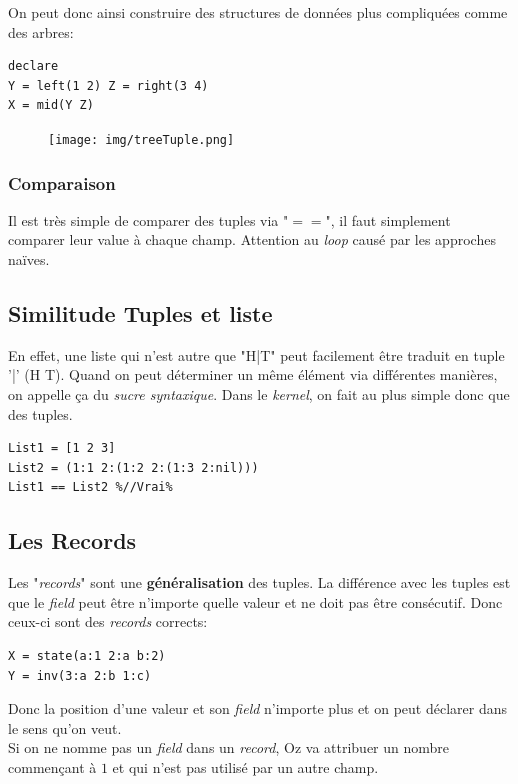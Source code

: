 \documentclass{report}
\begin{document}
On peut donc ainsi construire des structures de données plus compliquées comme des arbres:
\begin{lstlisting}
declare
Y = left(1 2) Z = right(3 4)
X = mid(Y Z)
\end{lstlisting}

\begin{figure}[H]
\centering
\texttt{[image: img/treeTuple.png]}
\end{figure}
\subsubsection{Comparaison}
Il est très simple de comparer des tuples via "$==$", il faut simplement comparer leur value à chaque champ. Attention au \textit{loop} causé par les approches naïves.\\

\subsection{Similitude Tuples et liste}
En effet, une liste qui n'est autre que "H|T" peut facilement être traduit en tuple '|' (H T). Quand on peut déterminer un même élément via différentes manières, on appelle ça du \textit{sucre syntaxique}. Dans le \textit{kernel}, on fait au plus simple donc que des tuples.
\begin{lstlisting}[escapechar=\%]
List1 = [1 2 3]
List2 = (1:1 2:(1:2 2:(1:3 2:nil)))
List1 == List2 %//Vrai%
\end{lstlisting}

\subsection{Les Records} \label{record}
Les "\textit{records}" sont une \textbf{généralisation} des tuples. La différence avec les tuples est que le \textit{field} peut être n'importe quelle valeur et ne doit pas être consécutif. Donc ceux-ci sont des \textit{records} corrects:
\begin{lstlisting}
X = state(a:1 2:a b:2)
Y = inv(3:a 2:b 1:c)
\end{lstlisting}
Donc la position d'une valeur et son \textit{field} n'importe plus et on peut déclarer dans le sens qu'on veut.\\
Si on ne nomme pas un \textit{field} dans un \textit{record}, Oz va attribuer un nombre commençant à $1$ et qui n'est pas utilisé par un autre champ.\\
\end{document}
